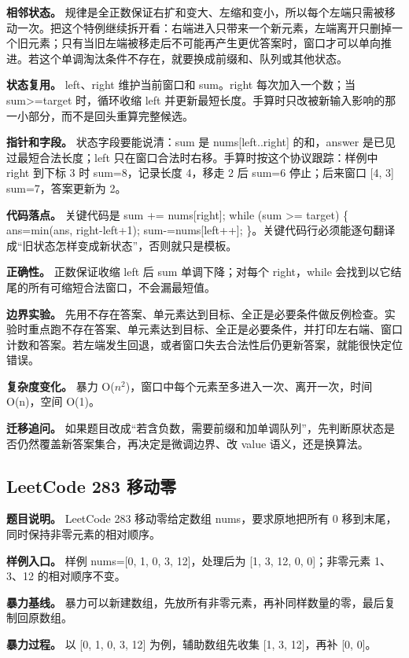 \textbf{相邻状态。} 规律是全正数保证右扩和变大、左缩和变小，所以每个左端只需被移动一次。把这个特例继续拆开看：右端进入只带来一个新元素，左端离开只删掉一个旧元素；只有当旧左端被移走后不可能再产生更优答案时，窗口才可以单向推进。若这个单调淘汰条件不存在，就要换成前缀和、队列或其他状态。

\textbf{状态复用。} left、right 维护当前窗口和 sum。right 每次加入一个数；当 sum>=target 时，循环收缩 left 并更新最短长度。手算时只改被新输入影响的那一小部分，而不是回头重算完整候选。

\textbf{指针和字段。} 状态字段要能说清：sum 是 nums[left..right] 的和，answer 是已见过最短合法长度；left 只在窗口合法时右移。手算时按这个协议跟踪：样例中 right 到下标 3 时 sum=8，记录长度 4，移走 2 后 sum=6 停止；后来窗口 [4, 3] sum=7，答案更新为 2。

\textbf{代码落点。} 关键代码是 sum += nums[right]; while (sum >= target) \{ ans=min(ans, right-left+1); sum-=nums[left++]; \}。关键代码行必须能逐句翻译成“旧状态怎样变成新状态”，否则就只是模板。

\textbf{正确性。} 正数保证收缩 left 后 sum 单调下降；对每个 right，while 会找到以它结尾的所有可缩短合法窗口，不会漏最短值。

\textbf{边界实验。} 先用不存在答案、单元素达到目标、全正是必要条件做反例检查。实验时重点跑不存在答案、单元素达到目标、全正是必要条件，并打印左右端、窗口计数和答案。若左端发生回退，或者窗口失去合法性后仍更新答案，就能很快定位错误。

\textbf{复杂度变化。} 暴力 O(\ensuremath{n^{2}})，窗口中每个元素至多进入一次、离开一次，时间 O(n)，空间 O(1)。

\textbf{迁移追问。} 如果题目改成“若含负数，需要前缀和加单调队列”，先判断原状态是否仍然覆盖新答案集合，再决定是微调边界、改 value 语义，还是换算法。

\subsection{LeetCode 283 移动零}

\textbf{题目说明。} LeetCode 283 移动零给定数组 nums，要求原地把所有 0 移到末尾，同时保持非零元素的相对顺序。

\textbf{样例入口。} 样例 nums=[0, 1, 0, 3, 12]，处理后为 [1, 3, 12, 0, 0]；非零元素 1、3、12 的相对顺序不变。

\textbf{暴力基线。} 暴力可以新建数组，先放所有非零元素，再补同样数量的零，最后复制回原数组。

\textbf{暴力过程。} 以 [0, 1, 0, 3, 12] 为例，辅助数组先收集 [1, 3, 12]，再补 [0, 0]。

